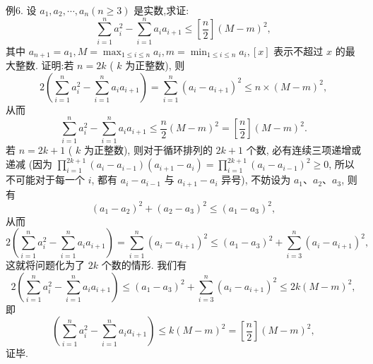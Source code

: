 例6. 设 $a_1, a_2, \cdots, a_n(n \geqslant 3)$ 是实数,求证:
$$
\sum_{i=1}^n a_i^2-\sum_{i=1}^n a_i a_{i+1} \leqslant\left[\frac{n}{2}\right](M-m)^2,
$$
其中 $a_{n+1}=a_1, M=\max _{1 \leqslant i \leqslant n} a_i, m=\min _{1 \leqslant i \leqslant n} a_i,[x]$ 表示不超过 $x$ 的最大整数.
证明:若 $n=2 k$ ( $k$ 为正整数), 则
$$
2\left(\sum_{i=1}^n a_i^2-\sum_{i=1}^n a_i a_{i+1}\right)=\sum_{i=1}^n\left(a_i-a_{i+1}\right)^2 \leqslant n \times(M-m)^2,
$$
从而
$$
\sum_{i=1}^n a_i^2-\sum_{i=1}^n a_i a_{i+1} \leqslant \frac{n}{2}(M-m)^2=\left[\frac{n}{2}\right](M-m)^2 .
$$
若 $n=2 k+1$ ( $k$ 为正整数), 则对于循环排列的 $2 k+1$ 个数, 必有连续三项递增或递减 (因为 $\prod_{i=1}^{2 k+1}\left(a_i-a_{i-1}\right)\left(a_{i+1}-a_i\right)=\prod_{i=1}^{2 k+1}\left(a_i-a_{i-1}\right)^2 \geqslant 0$, 所以不可能对于每一个 $i$, 都有 $a_i-a_{i-1}$ 与 $a_{i+1}-a_i$ 异号), 不妨设为 $a_1 、 a_2 、 a_3$, 则有
$$
\left(a_1-a_2\right)^2+\left(a_2-a_3\right)^2 \leqslant\left(a_1-a_3\right)^2,
$$
从而
$$
2\left(\sum_{i=1}^n a_i^2-\sum_{i=1}^n a_i a_{i+1}\right)=\sum_{i=1}^n\left(a_i-a_{i+1}\right)^2 \leqslant\left(a_1-a_3\right)^2+\sum_{i=3}^n\left(a_i-a_{i+1}\right)^2,
$$
这就将问题化为了 $2 k$ 个数的情形.
我们有
$$
2\left(\sum_{i=1}^n a_i^2-\sum_{i=1}^n a_i a_{i+1}\right) \leqslant\left(a_1-a_3\right)^2+\sum_{i=3}^n\left(a_i-a_{i+1}\right)^2 \leqslant 2 k(M-m)^2,
$$
即
$$
\left(\sum_{i=1}^n a_i^2-\sum_{i=1}^n a_i a_{i+1}\right) \leqslant k(M-m)^2=\left[\frac{n}{2}\right](M-m)^2,
$$
证毕.



